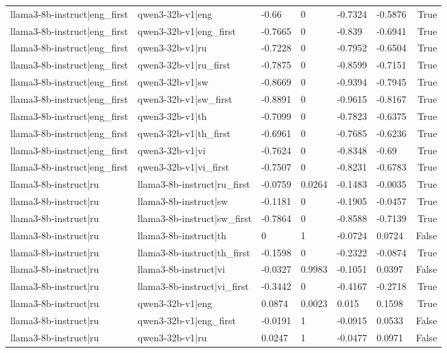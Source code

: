 \begin{table}
\begin{tabular}{llllllr}
llama3-8b-instruct|eng_first & qwen3-32b-v1|eng & -0.66 & 0 & -0.7324 & -0.5876 & True \\
llama3-8b-instruct|eng_first & qwen3-32b-v1|eng_first & -0.7665 & 0 & -0.839 & -0.6941 & True \\
llama3-8b-instruct|eng_first & qwen3-32b-v1|ru & -0.7228 & 0 & -0.7952 & -0.6504 & True \\
llama3-8b-instruct|eng_first & qwen3-32b-v1|ru_first & -0.7875 & 0 & -0.8599 & -0.7151 & True \\
llama3-8b-instruct|eng_first & qwen3-32b-v1|sw & -0.8669 & 0 & -0.9394 & -0.7945 & True \\
llama3-8b-instruct|eng_first & qwen3-32b-v1|sw_first & -0.8891 & 0 & -0.9615 & -0.8167 & True \\
llama3-8b-instruct|eng_first & qwen3-32b-v1|th & -0.7099 & 0 & -0.7823 & -0.6375 & True \\
llama3-8b-instruct|eng_first & qwen3-32b-v1|th_first & -0.6961 & 0 & -0.7685 & -0.6236 & True \\
llama3-8b-instruct|eng_first & qwen3-32b-v1|vi & -0.7624 & 0 & -0.8348 & -0.69 & True \\
llama3-8b-instruct|eng_first & qwen3-32b-v1|vi_first & -0.7507 & 0 & -0.8231 & -0.6783 & True \\
llama3-8b-instruct|ru & llama3-8b-instruct|ru_first & -0.0759 & 0.0264 & -0.1483 & -0.0035 & True \\
llama3-8b-instruct|ru & llama3-8b-instruct|sw & -0.1181 & 0 & -0.1905 & -0.0457 & True \\
llama3-8b-instruct|ru & llama3-8b-instruct|sw_first & -0.7864 & 0 & -0.8588 & -0.7139 & True \\
llama3-8b-instruct|ru & llama3-8b-instruct|th & 0 & 1 & -0.0724 & 0.0724 & False \\
llama3-8b-instruct|ru & llama3-8b-instruct|th_first & -0.1598 & 0 & -0.2322 & -0.0874 & True \\
llama3-8b-instruct|ru & llama3-8b-instruct|vi & -0.0327 & 0.9983 & -0.1051 & 0.0397 & False \\
llama3-8b-instruct|ru & llama3-8b-instruct|vi_first & -0.3442 & 0 & -0.4167 & -0.2718 & True \\
llama3-8b-instruct|ru & qwen3-32b-v1|eng & 0.0874 & 0.0023 & 0.015 & 0.1598 & True \\
llama3-8b-instruct|ru & qwen3-32b-v1|eng_first & -0.0191 & 1 & -0.0915 & 0.0533 & False \\
llama3-8b-instruct|ru & qwen3-32b-v1|ru & 0.0247 & 1 & -0.0477 & 0.0971 & False \\

\end{tabular}
\end{table}
